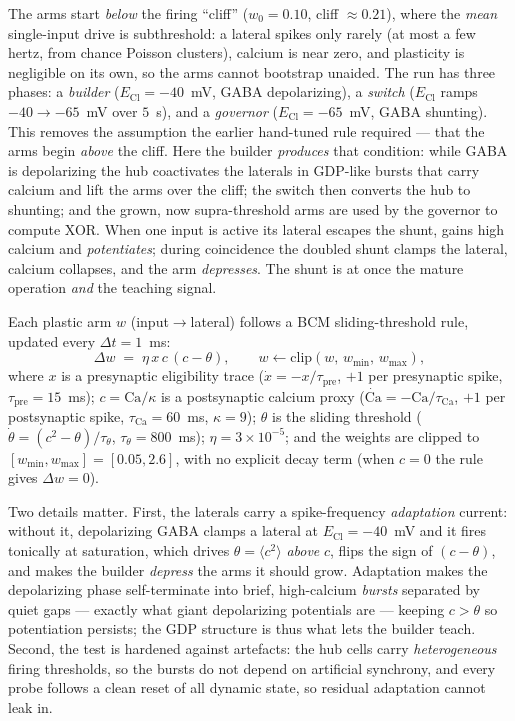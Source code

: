 \documentclass[11pt,a4paper]{article}
\newcommand{\ECl}{E_{\mathrm{Cl}}}
\begin{document}
The arms start \emph{below} the firing ``cliff'' ($w_0=0.10$, cliff $\approx0.21$), where the \emph{mean} single-input drive is subthreshold: a lateral spikes only rarely (at most a few hertz, from chance Poisson clusters), calcium is near zero, and plasticity is negligible on its own, so the arms cannot bootstrap unaided. The run has three phases: a \emph{builder} ($\ECl=-40$~mV, GABA depolarizing), a \emph{switch} ($\ECl$ ramps $-40\to-65$~mV over $5$~s), and a \emph{governor} ($\ECl=-65$~mV, GABA shunting). This removes the assumption the earlier hand-tuned rule required --- that the arms begin \emph{above} the cliff. Here the builder \emph{produces} that condition: while GABA is depolarizing the hub coactivates the laterals in GDP-like bursts that carry calcium and lift the arms over the cliff; the switch then converts the hub to shunting; and the grown, now supra-threshold arms are used by the governor to compute XOR. When one input is active its lateral escapes the shunt, gains high calcium and \emph{potentiates}; during coincidence the doubled shunt clamps the lateral, calcium collapses, and the arm \emph{depresses}. The shunt is at once the mature operation \emph{and} the teaching signal.

Each plastic arm $w$ (input$\to$lateral) follows a BCM sliding-threshold rule, updated every $\Delta t=1$~ms:
\begin{equation}
\Delta w \;=\; \eta\,x\,c\,(c-\theta),\qquad w \leftarrow \mathrm{clip}(w,\,w_{\min},\,w_{\max}),
\end{equation}
where $x$ is a presynaptic eligibility trace ($\dot{x}=-x/\tau_{\mathrm{pre}}$, $+1$ per presynaptic spike, $\tau_{\mathrm{pre}}=15$~ms); $c=\mathrm{Ca}/\kappa$ is a postsynaptic calcium proxy ($\dot{\mathrm{Ca}}=-\mathrm{Ca}/\tau_{\mathrm{Ca}}$, $+1$ per postsynaptic spike, $\tau_{\mathrm{Ca}}=60$~ms, $\kappa=9$); $\theta$ is the sliding threshold ($\dot{\theta}=(c^{2}-\theta)/\tau_{\theta}$, $\tau_{\theta}=800$~ms); $\eta=3\times10^{-5}$; and the weights are clipped to $[w_{\min},w_{\max}]=[0.05,2.6]$, with no explicit decay term (when $c=0$ the rule gives $\Delta w=0$).

Two details matter. First, the laterals carry a spike-frequency \emph{adaptation} current: without it, depolarizing GABA clamps a lateral at $\ECl=-40$~mV and it fires tonically at saturation, which drives $\theta=\langle c^{2}\rangle$ \emph{above} $c$, flips the sign of $(c-\theta)$, and makes the builder \emph{depress} the arms it should grow. Adaptation makes the depolarizing phase self-terminate into brief, high-calcium \emph{bursts} separated by quiet gaps --- exactly what giant depolarizing potentials are --- keeping $c>\theta$ so potentiation persists; the GDP structure is thus what lets the builder teach. Second, the test is hardened against artefacts: the hub cells carry \emph{heterogeneous} firing thresholds, so the bursts do not depend on artificial synchrony, and every probe follows a clean reset of all dynamic state, so residual adaptation cannot leak in.
\end{document}
